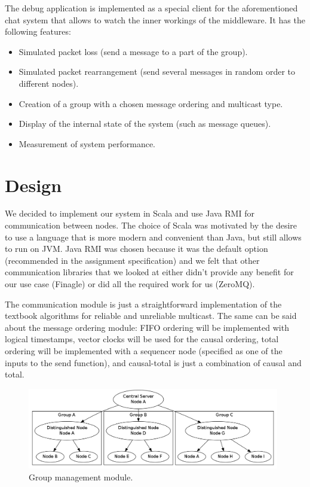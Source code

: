 \documentclass[10pt, oneside]{article}
\begin{document}
The debug application is implemented as a special client for the aforementioned
chat system that allows to watch the inner workings of the middleware. It has
the following features:
\begin{itemize}
\item Simulated packet loss (send a message to a part of the group).
\item Simulated packet rearrangement (send several messages in random order to
  different nodes).
\item Creation of a group with a chosen message ordering and multicast type.
\item Display of the internal state of the system (such as message queues).
\item Measurement of system performance.
\end{itemize}

\section{Design}

We decided to implement our system in Scala and use Java RMI for communication
between nodes. The choice of Scala was motivated by the desire to use a language
that is more modern and convenient than Java, but still allows to run on
JVM. Java RMI was chosen because it was the default option (recommended in the
assignment specification) and we felt that other communication libraries that we
looked at either didn't provide any benefit for our use case (Finagle) or did
all the required work for us (ZeroMQ).

The communication module is just a straightforward implementation of the
textbook algorithms for reliable and unreliable multicast\cite{Textbook}. The
same can be said about the message ordering module: FIFO ordering will be
implemented with logical timestamps, vector clocks will be used for the causal
ordering, total ordering will be implemented with a sequencer node (specified as
one of the inputs to the send function), and causal-total is just a combination
of causal and total.

\begin{figure}[h]
\centering
\includegraphics[width=11cm]{graph1}
\caption{Group management module.}
\label{fig:group}
\end{figure}
\end{document}
